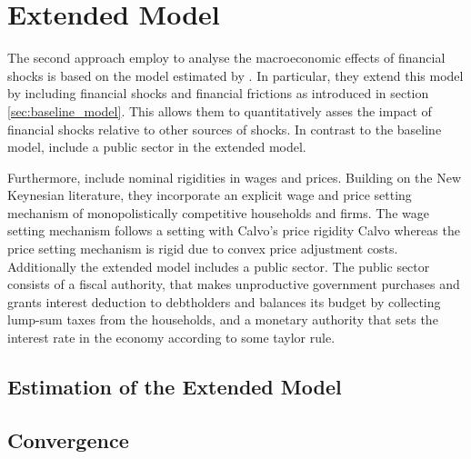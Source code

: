 \newpage

\section{Extended Model}
\label{sec:extended_model}

The second approach \citeauthor{JERMANNfinancial} employ to analyse the macroeconomic effects of financial shocks is based on the model estimated by \citet{SMETSshocks}. In particular, they extend this model by including financial shocks and financial frictions as introduced in section \ref{sec:baseline_model}. This allows them to quantitatively asses the impact of financial shocks relative to other sources of shocks. In contrast to the baseline model, \citeauthor{JERMANNfinancial} include a public sector in the extended model. 

Furthermore, \citeauthor{JERMANNfinancial} include nominal rigidities in wages and prices. Building on the New Keynesian literature, they incorporate an explicit wage and price setting mechanism of monopolistically competitive households and firms. The wage setting mechanism follows a setting with Calvo's price rigidity Calvo whereas the price setting mechanism is rigid due to convex price adjustment costs. Additionally the extended model
includes a public sector. The public sector consists of a fiscal authority, that
makes unproductive government purchases and grants interest deduction to
debtholders and balances its budget by collecting lump-sum taxes from the
households, and a monetary authority that sets the interest rate in the economy
according to some taylor rule.



\subsection{Estimation of the Extended Model}
\label{sec:extended_model_estimation}



\subsection{Convergence}
\label{sec:convergence}
